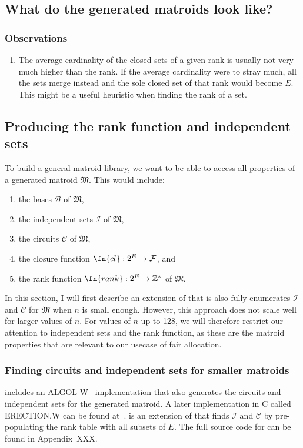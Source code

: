 \subsection{What do the generated matroids look like?}
\subsubsection{Observations}
\begin{enumerate}
  \item The average cardinality of the closed sets of a given rank is usually not very much higher than the rank. If the average cardinality were to stray much, all the sets merge instead and the sole closed set of that rank would become $E$. This might be a useful heuristic when finding the rank of a set.
\end{enumerate}


\subsection{Producing the rank function and independent sets}
To build a general matroid library, we want to be able to access all properties of a generated matroid $\mathfrak{M}$. This would include:
\begin{enumerate}
  \item the bases $\mathcal{B}$ of $\mathfrak{M}$,
  \item the independent sets $\mathcal{I}$ of $\mathfrak{M}$,
  \item the circuits $\mathcal{C}$ of $\mathfrak{M}$,
  \item the closure function $\fn{cl} : 2^E \to \mathcal{F}$, and
  \item the rank function $\fn{rank} : 2^E \to \mathbb{Z}^*$ of $\mathfrak{M}$.
\end{enumerate}

In this section, I will first describe an extension of  that is also fully enumerates $\mathcal{I}$ and $\mathcal{C}$ for $\mathfrak{M}$ when $n$ is small enough. However, this approach does not scale well for larger values of $n$. For values of $n$ up to 128, we will therefore restrict our attention to independent sets and the rank function, as these are the matroid properties that are relevant to our usecase of fair allocation.

\subsubsection{Finding circuits and independent sets for smaller matroids}
\cite{knuth-1975} includes an ALGOL W~\cite{wirth-1966} implementation that also generates the circuits and independent sets for the generated matroid. A later implementation in C called ERECTION.W can be found at~\cite{knuth-2003}.  is an extension of  that finds $\mathcal{I}$ and $\mathcal{C}$ by pre-populating the rank table with all subsets of $E$. The full source code for  can be found in Appendix~XXX.

